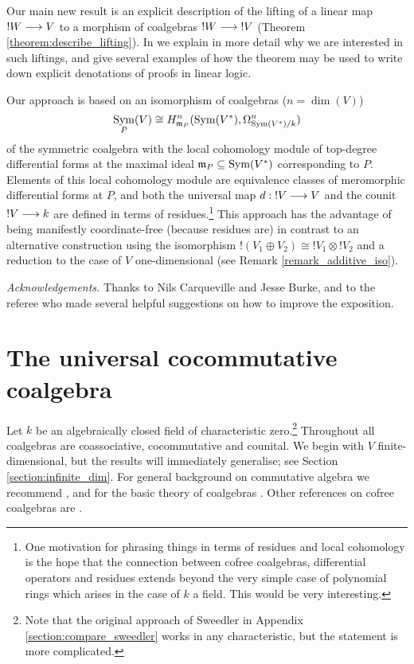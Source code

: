 \documentclass[english,letter paper,12pt,reqno]{article}
\theoremstyle{example}
\numberwithin{equation}{section}
\DeclareMathOperator{\Sym}{Sym}
\begin{document}
Our main new result is an explicit description of the lifting of a linear map ${!} W \longrightarrow V$ to a morphism of coalgebras ${!} W \longrightarrow {!} V$ (Theorem \ref{theorem:describe_lifting}). In \cite{murfet_ll} we explain in more detail why we are interested in such liftings, and give several examples of how the theorem may be used to write down explicit denotations of proofs in linear logic.

Our approach is based on an isomorphism of coalgebras ($n = \dim(V)$)
\begin{equation}\label{eq:lc}
\Sym_P(V) \cong H^{n}_{\mf{m}_P}(\Sym(V^*), \Omega^n_{\Sym(V^*)/k})
\end{equation}
of the symmetric coalgebra with the local cohomology module of top-degree differential forms at the maximal ideal $\mf{m}_P \subseteq \Sym(V^*)$ corresponding to $P$. Elements of this local cohomology module are equivalence classes of meromorphic differential forms at $P$, and both the universal map $d: {!} V \longrightarrow V$ and the counit ${!} V \longrightarrow k$ are defined in terms of residues.\footnote{One motivation for phrasing things in terms of residues and local cohomology is the hope that the connection between cofree coalgebras, differential operators and residues extends beyond the very simple case of polynomial rings which arises in the case of $k$ a field. This would be very interesting.} This approach has the advantage of being manifestly coordinate-free (because residues are) in contrast to an alternative construction using the isomorphism ${!}( V_1 \oplus V_2 ) \cong {!} V_1 \otimes {!} V_2$ and a reduction to the case of $V$ one-dimensional (see Remark \ref{remark_additive_iso}).

\vspace{0.2cm}

\emph{Acknowledgements.} Thanks to Nils Carqueville and Jesse Burke, and to the referee who made several helpful suggestions on how to improve the exposition.

\section{The universal cocommutative coalgebra}\label{section:expmod}

Let $k$ be an algebraically closed field of characteristic zero.\footnote{Note that the original approach of Sweedler in Appendix \ref{section:compare_sweedler} works in any characteristic, but the statement is more complicated.} Throughout all coalgebras are coassociative, cocommutative and counital. We begin with $V$ finite-dimensional, but the results will immediately generalise; see Section \ref{section:infinite_dim}. For general background on commutative algebra we recommend \cite{eisenbud}, and for the basic theory of coalgebras \cite{sweedler}. Other references on cofree coalgebras are \cite{getzler, anel, block-leroux, hazewinkel, smith, barr}.
\\
\end{document}

